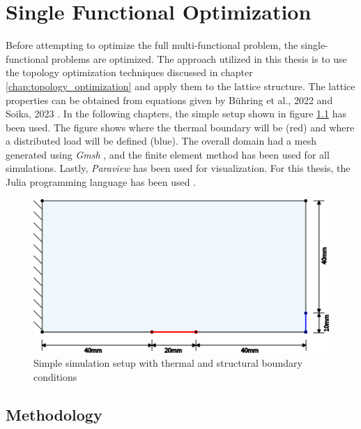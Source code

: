 \chapter{Single Functional Optimization}
\label{chap:singe_functional_optimization}
Before attempting to optimize the full multi-functional problem, the single-functional problems are optimized. The approach utilized in this thesis is to use the topology optimization techniques discussed in chapter \ref{chap:topology_optimization} and apply them to the lattice structure. The lattice properties can be obtained from equations given by Bühring et al., 2022 \cite{Bühring_Soika_Schirp-Schoenen_Schröder_2022} and Soika, 2023 \cite{Piacquadio_Soika_Schirp_Schröder_Filippeschi_2023}. In the following chapters, the simple setup shown in figure \ref{fig:simple_domain} has been used. The figure shows where the thermal boundary will be (red) and where a distributed load will be defined (blue). The overall domain had a mesh generated using \emph{Gmsh} \cite{Geuzaine_Remacle_2009}, and the finite element method has been used for all simulations. Lastly, \emph{Paraview} \cite{ParaView} has been used for visualization. For this thesis, the Julia programming language has been used \cite{Julia-2017}.
\begin{figure}[ht]
  \centering
  \includegraphics[width=0.75\linewidth]{figures/chapter_4/SimpleDomain.png}
  \caption{Simple simulation setup with thermal and structural boundary conditions}
  \label{fig:simple_domain}
\end{figure}


\section{Methodology}
